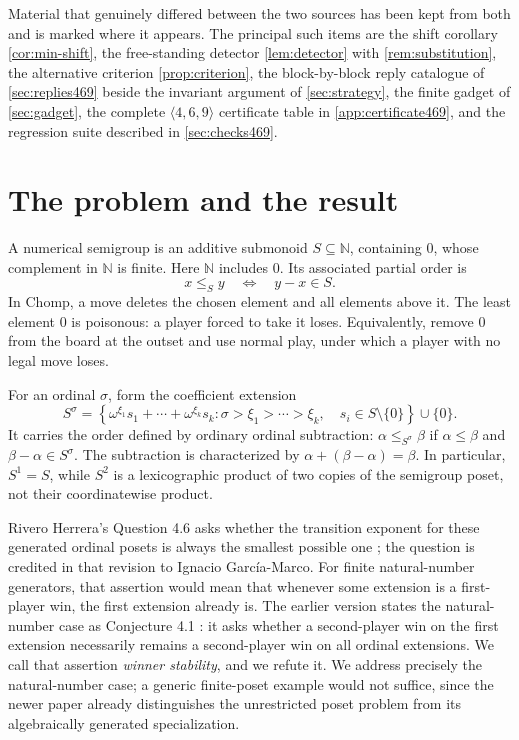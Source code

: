 \documentclass[11pt,letterpaper]{article}
\numberwithin{equation}{section}
\theoremstyle{definition}
\theoremstyle{remark}
\newcommand{\N}{\mathbb N}
\begin{document}
Material that genuinely differed between the two sources has been kept
from both and is marked where it appears. The principal such items are the
shift corollary \cref{cor:min-shift}, the free-standing detector
\cref{lem:detector} with \cref{rem:substitution}, the alternative
criterion \cref{prop:criterion}, the block-by-block reply catalogue of
\cref{sec:replies469} beside the invariant argument of
\cref{sec:strategy}, the finite gadget of \cref{sec:gadget}, the complete
$\langle4,6,9\rangle$ certificate table in \cref{app:certificate469}, and
the regression suite described in \cref{sec:checks469}.

\section{The problem and the result}\label{sec:problem}

A numerical semigroup is an additive submonoid $S\subseteq\N$, containing
0, whose complement in $\N$ is finite. Here $\N$ includes 0. Its associated
partial order is
\begin{equation}\label{eq:semigroup-order}
 x\leq_S y \quad\Longleftrightarrow\quad y-x\in S.
\end{equation}
In Chomp, a move deletes the chosen element and all elements above it.
The least element 0 is poisonous: a player forced to take it loses.
Equivalently, remove 0 from the board at the outset and use normal play,
under which a player with no legal move loses.

For an ordinal $\sigma$, form the coefficient extension
\begin{equation}\label{eq:extension}
 S^\sigma=
 \left\{\omega^{\xi_1}s_1+\cdots+\omega^{\xi_k}s_k:
 \sigma>\xi_1>\cdots>\xi_k,\quad s_i\in S\setminus\{0\}\right\}
 \cup\{0\}.
\end{equation}
It carries the order defined by ordinary ordinal subtraction:
$\alpha\leq_{S^\sigma}\beta$ if $\alpha\leq\beta$ and
$\beta-\alpha\in S^\sigma$. The subtraction is characterized by
$\alpha+(\beta-\alpha)=\beta$. In particular, $S^1=S$, while $S^2$ is a
lexicographic product of two copies of the semigroup poset, not their
coordinatewise product.

Rivero Herrera's Question 4.6 asks whether the transition exponent for
these generated ordinal posets is always the smallest possible one
\cite{RH26}; the question is credited in that revision to Ignacio
Garc\'ia-Marco. For finite natural-number generators, that assertion would
mean that whenever some extension is a first-player win, the first
extension already is. The earlier version states the natural-number case
as Conjecture 4.1 \cite{RH25}: it asks whether a second-player win on the
first extension necessarily remains a second-player win on all ordinal
extensions. We call that assertion \emph{winner stability}, and we refute
it. We address precisely the natural-number case; a generic finite-poset
example would not suffice, since the newer paper already distinguishes the
unrestricted poset problem from its algebraically generated
specialization.
\end{document}
